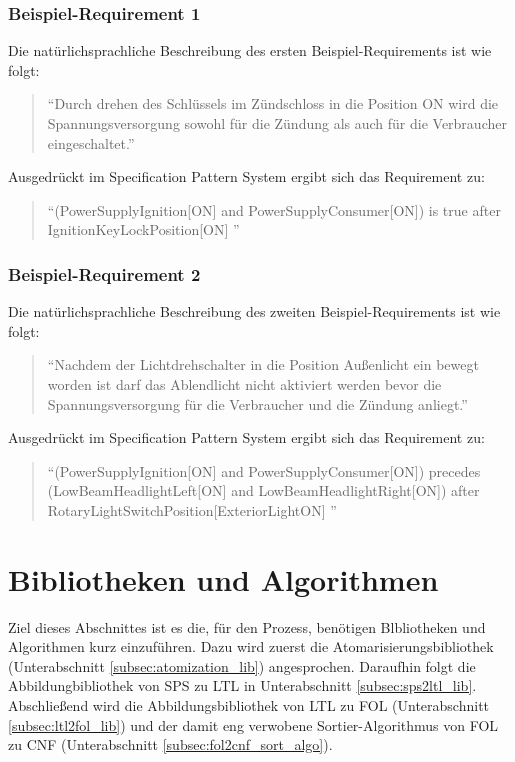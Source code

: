 \subsubsection{Beispiel-Requirement 1}
\label{subsubsec:ex_req_1}
Die natürlichsprachliche Beschreibung des ersten Beispiel-Requirements ist wie folgt:
\begin{quote}
	"`Durch drehen des Schlüssels im Zündschloss in die Position ON wird die Spannungsversorgung sowohl für die Zündung als auch für die Verbraucher eingeschaltet."' 
\end{quote}
Ausgedrückt im Specification Pattern System ergibt sich das Requirement zu:
\begin{quote}
	"`(PowerSupplyIgnition[ON] and PowerSupplyConsumer[ON]) is true after IgnitionKeyLockPosition[ON] "' 
\end{quote}
\subsubsection{Beispiel-Requirement 2}
\label{subsubsec:ex_req_2}
Die natürlichsprachliche Beschreibung des zweiten Beispiel-Requirements ist wie folgt:
\begin{quote}
	"`Nachdem der Lichtdrehschalter in die Position Außenlicht ein bewegt worden ist darf das Ablendlicht nicht aktiviert werden bevor die Spannungsversorgung für die Verbraucher und die Zündung anliegt."' 
\end{quote}
Ausgedrückt im Specification Pattern System ergibt sich das Requirement zu:
\begin{quote}
	"`(PowerSupplyIgnition[ON] and PowerSupplyConsumer[ON]) precedes (LowBeamHeadlightLeft[ON] and LowBeamHeadlightRight[ON]) after RotaryLightSwitchPosition[ExteriorLightON] "' 
\end{quote}
\section{Bibliotheken und Algorithmen}
\label{sec:lib_algo}
Ziel dieses Abschnittes ist es die, für den Prozess, benötigen Blbliotheken und Algorithmen kurz einzuführen. Dazu wird zuerst die Atomarisierungsbibliothek (Unterabschnitt \ref{subsec:atomization_lib}) angesprochen. Daraufhin folgt die Abbildungbibliothek von SPS zu LTL in Unterabschnitt \ref{subsec:sps2ltl_lib}. Abschließend wird die Abbildungsbibliothek von LTL zu FOL (Unterabschnitt \ref{subsec:ltl2fol_lib}) und der damit eng verwobene Sortier-Algorithmus von FOL zu CNF (Unterabschnitt \ref{subsec:fol2cnf_sort_algo}).
